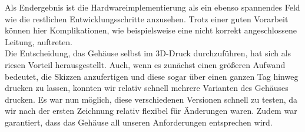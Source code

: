 \label{FazitHW}

Als Endergebnis ist die Hardwareimplementierung als ein ebenso spannendes Feld wie die restlichen Entwicklungsschritte anzusehen. Trotz einer guten Vorarbeit können hier Komplikationen, wie beispielsweise eine nicht korrekt angeschlossene Leitung, auftreten. \\
Die Entscheidung, das Gehäuse selbst im 3D-Druck durchzuführen, hat sich als riesen Vorteil herausgestellt. Auch, wenn es zunächst einen größeren Aufwand bedeutet, die Skizzen anzufertigen und diese sogar über einen ganzen Tag hinweg drucken zu lassen, konnten wir relativ schnell mehrere Varianten des Gehäuses drucken. Es war nun möglich, diese verschiedenen Versionen schnell zu testen, da wir nach der ersten Zeichnung relativ flexibel für Änderungen waren. Zudem war garantiert, dass das Gehäuse all unseren Anforderungen entsprechen wird.